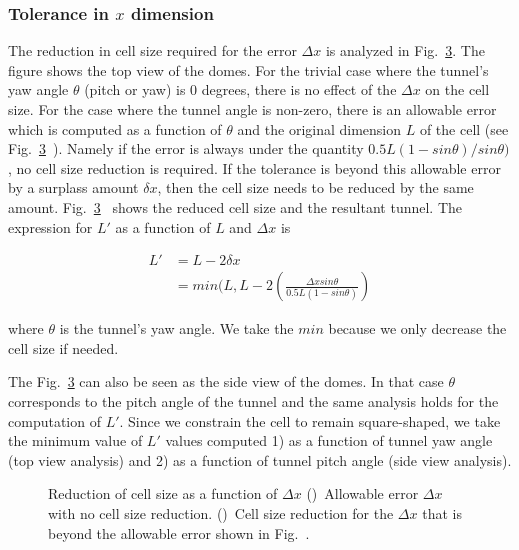\documentclass[a4paper]{report}
\begin{document}
\subsubsection{Tolerance in $x$ dimension}
The reduction in cell size required for the error $\Delta x$ is analyzed in Fig.~\ref{fig:shield_x}. The figure shows the top view of the domes. For the trivial case where the tunnel's yaw angle $\theta$ (pitch or yaw) is 0 degrees, there is no effect of the $\Delta x$ on the cell size. 
For the case where the tunnel angle is non-zero, there is an allowable error which is computed as a function of $\theta$ and the original dimension $L$ of the cell (see Fig.~\ref{fig:shield_x}~). Namely if the error is always under the quantity $0.5L(1 -sin \theta) / sin \theta)$, no cell size reduction is required.
If the tolerance is beyond this allowable error by a surplass amount $\delta x$, then the cell size needs to be reduced by the same amount. Fig.~\ref{fig:shield_x}~ shows the reduced cell size and the resultant tunnel. The expression for $L'$ as a function of $L$ and $\Delta x$ is

\begin{equation} \label{eq1}
\begin{split}
L' & = L - 2 \delta x \\
   & = min(L, L - 2(\frac{\Delta x sin \theta} {0.5L (1 - sin \theta)})
\end{split}
\end{equation}

where $\theta$ is the tunnel's yaw angle. We take the $min$ because we only decrease the cell size if needed.

The Fig.~\ref{fig:shield_x} can also be seen as the side view of the domes. In that case $\theta$ corresponds to the pitch angle of the tunnel and the same analysis holds for the computation of $L'$.
%
Since we constrain the cell to remain square-shaped, we take the minimum value of $L'$ values computed 1) as a function of tunnel yaw angle (top view analysis) and 2) as a function of tunnel pitch angle (side view analysis).

\begin{figure}[ht]
    \centering
    \begin{subfigure}{0.48\textwidth}
        \caption{}
        \label{fig:shield_xa}
    \end{subfigure} 
    \begin{subfigure}{0.48\textwidth}
        \caption{}
        \label{fig:shield_xb}
    \end{subfigure}
    \caption{
    Reduction of cell size as a function of $\Delta x$
     ()~Allowable error $\Delta x$ with no cell size reduction.
    ()~Cell size reduction for the $\Delta x$ that is beyond the allowable error shown in Fig.~.
    }
\label{fig:shield_x}
\end{figure}
\end{document}
